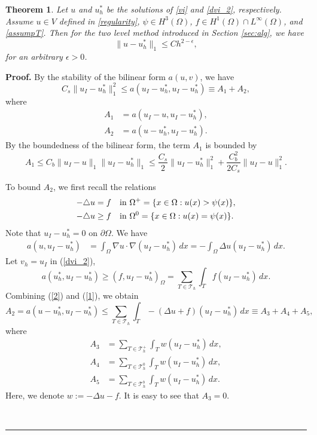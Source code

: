 \documentclass[12pt]{article}
\newtheorem{theorem}{Theorem}[section]
\newenvironment{proof}[1][Proof]{\textbf{#1.} }
{\ \rule{0.75em}{0.75em}\smallskip}
\begin{document}
\begin{theorem}\label{thm1qua}
Let $u$ and $u_h^*$ be the solutions of \eqref{vi} and \eqref{dvi_2}, respectively. 
Assume $u\in V$ defined in \eqref{regularity}, $\psi\in H^3(\Omega)$, $f\in H^1(\Omega)\cap L^\infty(\Omega)$, 
and \eqref{assumpT}.  Then for the two level method introduced in Section \ref{sec:alg}, we have
\begin{equation} \label{errh}
\|u-u_h^*\|_1 \leq C h^{2-\epsilon},
\end{equation}
for an arbitrary $\epsilon>0$.
\end{theorem}
\begin{proof}
By the stability of the bilinear form $a(u,v)$, we have
\begin{equation}
C_s\|u_I-u_h^*\|_1^2 \le a(u_I-u_h^*,u_I-u_h^*)\equiv A_1+A_2, \label{err1qua}
\end{equation}
where
\begin{align*}
A_1 &= a(u_I-u,u_I-u_h^*),\\
A_2&= a(u-u_h^*,u_I-u_h^*).
\end{align*}
By the boundedness of the bilinear form, the term $A_1$ is bounded by
\begin{equation}
  A_1 \leq C_b\|u_I-u\|_1\|u_I-u_h^*\|_1
   \le \frac{C_s}{2}\|u_I-u_h^*\|_1^2
    +\frac{C_b^2}{2C_s}\|u_I-u\|_1^2.
\label{err2qua}
\end{equation}

To bound $A_2$, we first recall the relations
\begin{align*}
 -\triangle u&=f\quad {\rm in}\ \Omega^+=\{x\in\Omega:u(x)>\psi(x)\},\\
 -\triangle u &\geq f\quad {\rm in}\ \Omega^0 = \{x\in \Omega:u(x) = \psi(x)\}.
\end{align*}
Note that $u_I - u_h^*=0$ on $\partial\Omega$.  We have
\begin{align}\label{1}
a(u,u_I-u_h^*)&=\int_\Omega\nabla u\cdot\nabla(u_I-u_h^*)\,dx=-\int_\Omega \Delta u (u_I-u_h^*)\,dx.
\end{align}
Let $v_h = u_I$ in (\ref{dvi_2}),
\begin{equation}\label{2}
  a(u_h^*,u_I-u_h^*) \ge (f,u_I-u_h^*)_\Omega = \sum_{T\in \mathcal{T}_h}\int_T f
  (u_I-u_h^*)\, dx.
\end{equation}
Combining (\ref{2}) and (\ref{1}), we obtain
\begin{equation}\label{T2}
A_2=a(u-u_h^*,u_I-u_h^*) \le\sum_{T\in \mathcal{T}_h}\int_T -(\Delta u+ f)(u_I-u_h^*)\,dx
\equiv A_3+A_4+A_5, 
\end{equation}
where
\begin{align*}
A_3 &= \sum_{T\in \mathcal{T}_h^+}\int_T w(u_I-u_h^*)\, dx, \\
A_4 & = \sum_{T\in \mathcal{T}_h^0}\int_T w(u_I-u_h^*)\, dx, \\
A_5 & = \sum_{T\in \mathcal{T}_h^b}\int_T w(u_I-u_h^*)\, dx.
\end{align*}
Here, we denote $w:=-\Delta u - f$. It is easy to see that $A_3=0$.


\end{proof}
\end{document}
